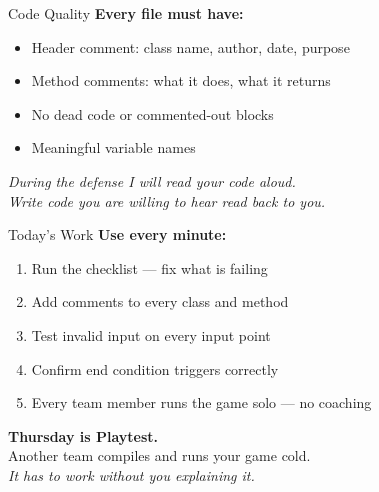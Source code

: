 \documentclass{beamer}
\begin{document}
\begin{frame}{Code Quality}
\textbf{Every file must have:}
\vspace{0.2cm}
\begin{itemize}
  \item Header comment: class name, author, date, purpose
  \item Method comments: what it does, what it returns
  \item No dead code or commented-out blocks
  \item Meaningful variable names
\end{itemize}
\vspace{0.3cm}
\textit{During the defense I will read your code aloud.}\\
\textit{Write code you are willing to hear read back to you.}
\end{frame}
\begin{frame}{Today's Work}
\textbf{Use every minute:}
\vspace{0.2cm}
\begin{enumerate}
  \item Run the checklist --- fix what is failing
  \item Add comments to every class and method
  \item Test invalid input on every input point
  \item Confirm end condition triggers correctly
  \item Every team member runs the game solo --- no coaching
\end{enumerate}
\vspace{0.3cm}
\textbf{Thursday is Playtest.}\\
Another team compiles and runs your game cold.\\
\vspace{0.3cm}
\textit{It has to work without you explaining it.}
\end{frame}
\end{document}
